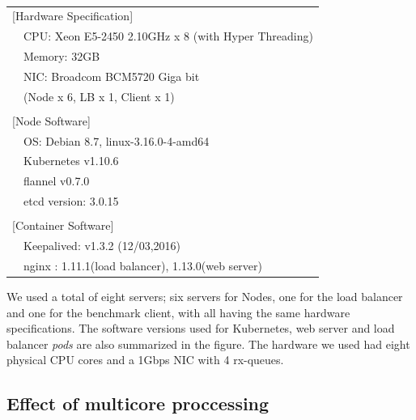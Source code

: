 \begin{table}[]
  \centering
  \begin{tabular}{ll}
    \hline 
    \multicolumn{2}{l}{[Hardware Specification]}   \\
    & CPU: Xeon E5-2450 2.10GHz x 8 (with Hyper Threading) \\
    & Memory: 32GB \\
    & NIC: Broadcom BCM5720 Giga bit \\
    & (Node x 6, LB x 1, Client x 1) \\
    & \\
    \multicolumn{2}{l}{[Node Software]}  \\
    & OS: Debian 8.7, linux-3.16.0-4-amd64 \\
    & Kubernetes v1.10.6 \\
    & flannel v0.7.0 \\
    & etcd version: 3.0.15 \\
    & \\
    \multicolumn{2}{l}{[Container Software]}   \\
    & Keepalived: v1.3.2 (12/03,2016) \\
    & nginx : 1.11.1(load balancer), 1.13.0(web server) \\
    \hline
  \end{tabular}
  \caption{}
  \label{tab:hw_sw_spec}
\end{table}

We used a total of eight servers; six servers for Nodes, one for the load balancer and one for the benchmark client, with all having the same hardware specifications.
The software versions used for Kubernetes, web server and load balancer {\em pods} are also summarized in the figure.
The hardware we used had eight physical CPU cores and a 1Gbps NIC with 4 rx-queues.


\subsection{Effect of multicore proccessing}

